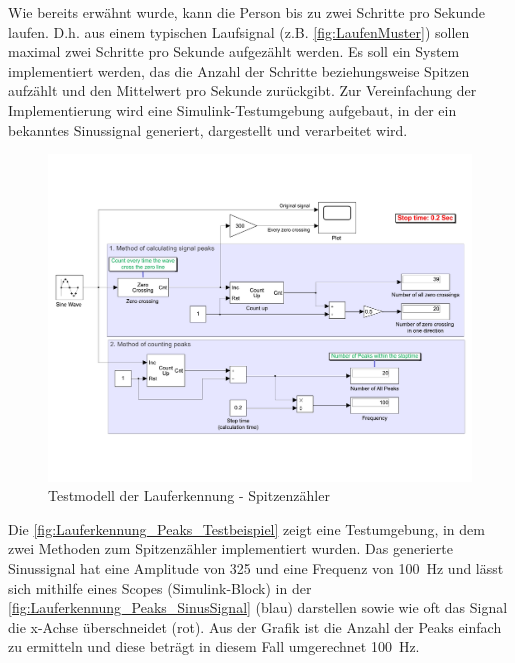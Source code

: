 Wie bereits erwähnt wurde, kann die Person bis zu zwei Schritte pro Sekunde laufen. D.h. aus einem typischen Laufsignal (z.B. \autoref{fig:LaufenMuster}) sollen maximal zwei Schritte pro Sekunde aufgezählt werden.
Es soll ein System implementiert werden, das die Anzahl der Schritte beziehungsweise Spitzen aufzählt und den Mittelwert pro Sekunde zurückgibt. Zur Vereinfachung der Implementierung wird eine Simulink-Testumgebung aufgebaut, in der ein bekanntes Sinussignal generiert, dargestellt und verarbeitet wird.
\begin{figure}[htpb]
	\centering
	\includegraphics[width=0.8\linewidth]{Bilder/TestmodellLauferkennungSpitzenzaehler.pdf}
	\caption{Testmodell der Lauferkennung - Spitzenzähler}
	\label{fig:Lauferkennung_Peaks_Testbeispiel}
\end{figure}
Die \autoref{fig:Lauferkennung_Peaks_Testbeispiel} zeigt eine Testumgebung, in dem zwei Methoden zum Spitzenzähler implementiert wurden.
Das generierte Sinussignal hat eine Amplitude von 325 und eine Frequenz von \SI{100}{\hertz} und lässt sich mithilfe eines Scopes (Simulink-Block) in der \autoref{fig:Lauferkennung_Peaks_SinusSignal} (blau) darstellen sowie wie oft das Signal die x-Achse überschneidet (rot). Aus der Grafik ist die Anzahl der Peaks einfach zu ermitteln und diese beträgt in diesem Fall umgerechnet \SI{100}{\hertz}.

